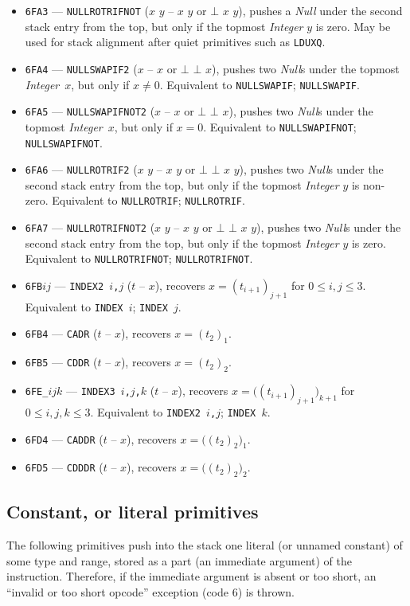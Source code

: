 \documentclass[12pt,oneside]{article}
\def\mysubsection#1{\subsection{#1}\fancyhead[C]{\small{\textsc{\textrm{\thesubsection.} #1}}}}
\begin{document}
\begin{itemize}
\item {\tt 6FA3} --- {\tt NULLROTRIFNOT} ($x$ $y$ -- $x$ $y$ or $\bot$ $x$ $y$), pushes a {\em Null\/} under the second stack entry from the top, but only if the topmost {\em Integer\/} $y$ is zero. May be used for stack alignment after quiet primitives such as {\tt LDUXQ}.
\item {\tt 6FA4} --- {\tt NULLSWAPIF2} ($x$ -- $x$ or $\bot$ $\bot$ $x$), pushes two {\em Null\/}s under the topmost {\em Integer\/}~$x$, but only if $x\neq0$. Equivalent to {\tt NULLSWAPIF}; {\tt NULLSWAPIF}.
\item {\tt 6FA5} --- {\tt NULLSWAPIFNOT2} ($x$ -- $x$ or $\bot$ $\bot$ $x$), pushes two {\em Null\/}s under the topmost {\em Integer\/}~$x$, but only if $x=0$. Equivalent to {\tt NULLSWAPIFNOT}; {\tt NULLSWAPIFNOT}.
\item {\tt 6FA6} --- {\tt NULLROTRIF2} ($x$ $y$ -- $x$ $y$ or $\bot$ $\bot$ $x$ $y$), pushes two {\em Null\/}s under the second stack entry from the top, but only if the topmost {\em Integer\/} $y$ is non-zero. Equivalent to {\tt NULLROTRIF}; {\tt NULLROTRIF}.
\item {\tt 6FA7} --- {\tt NULLROTRIFNOT2} ($x$ $y$ -- $x$ $y$ or $\bot$ $\bot$ $x$ $y$), pushes two {\em Null\/}s under the second stack entry from the top, but only if the topmost {\em Integer\/} $y$ is zero. Equivalent to {\tt NULLROTRIFNOT}; {\tt NULLROTRIFNOT}.
\item {\tt 6FB$ij$} --- {\tt INDEX2 $i$,$j$} ($t$ -- $x$), recovers $x=(t_{i+1})_{j+1}$ for $0\leq i,j\leq 3$. Equivalent to {\tt INDEX $i$}; {\tt INDEX $j$}.
\item {\tt 6FB4} --- {\tt CADR} ($t$ -- $x$), recovers $x=(t_2)_1$.
\item {\tt 6FB5} --- {\tt CDDR} ($t$ -- $x$), recovers $x=(t_2)_2$.
\item {\tt 6FE\_$ijk$} --- {\tt INDEX3 $i$,$j$,$k$} ($t$ -- $x$), recovers $x=\bigl((t_{i+1})_{j+1}\bigr)_{k+1}$ for $0\leq i,j,k\leq3$. Equivalent to {\tt INDEX2 $i$,$j$}; {\tt INDEX $k$}.
\item {\tt 6FD4} --- {\tt CADDR} ($t$ -- $x$), recovers $x=\bigl((t_2)_2\bigr)_1$.
\item {\tt 6FD5} --- {\tt CDDDR} ($t$ -- $x$), recovers $x=\bigl((t_2)_2\bigr)_2$.
\end{itemize}

\mysubsection{Constant, or literal primitives}

The following primitives push into the stack one literal (or unnamed constant) of some type and range, stored as a part (an immediate argument) of the instruction. Therefore, if the immediate argument is absent or too short, an ``invalid or too short opcode'' exception (code $6$) is thrown.
\end{document}

